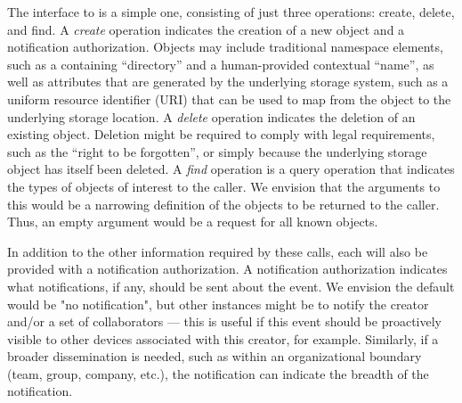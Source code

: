 The interface to \system is a simple one, consisting of just three operations: create, delete, and find. A \textit{create} operation indicates the creation of a new object and a notification authorization.  Objects may include traditional namespace elements, such as a containing ``directory'' and a human-provided contextual ``name'', as well as attributes that are generated by the underlying storage system, such as a uniform resource identifier (URI) that can be used to map from the \system object to the underlying storage location.  A \textit{delete} operation indicates the deletion of an existing object.  Deletion might be required to comply with legal requirements, such as the ``right to be forgotten'', or simply because the underlying storage object has itself been deleted.  A \textit{find} operation is a query operation that indicates the types of \system objects of interest to the caller. We envision that the arguments to this would be a narrowing definition of the \system objects to be returned to the caller.  Thus, an empty argument would be a request for all known \system objects.

In addition to the other information required by these calls, each will also be provided with a notification authorization.  A notification authorization indicates what notifications, if any, should be sent about the event.  We envision the default would be "no notification", but other instances might be to notify the creator and/or a set of collaborators --- this is useful if this event should be proactively visible to other devices associated with this creator, for example.  Similarly, if a broader dissemination is needed, such as within an organizational boundary (team, group, company, etc.), the notification can indicate the breadth of the notification.



\endinput

\sasha{Tasks: A short description of the overall architecture with a picture. 
Describe how we will solve the problems identified in the previous section. Create a new subsection for each problem. Reference those subsections in the table presented in the previous section. }



We observe that effectively all existing storage namespaces consist of a
key-value store and a naming layer.  For example, the traditional \texttt{inode}
model used in UNIX file systems typically uses a table of inodes which are in
turn referenced using an index value (the ``key'').  The corresponding meta-data
(or data) then is the ``value'' associated with the given key.

